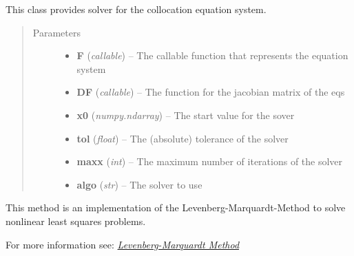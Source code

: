 \documentclass[letterpaper,10pt,english]{sphinxmanual}
\begin{document}
\begin{fulllineitems}
\label{pytrajectory:pytrajectory.solver.Solver}
This class provides solver for the collocation equation system.
\begin{quote}\begin{description}
\item[{Parameters}] \leavevmode\begin{itemize}
\item {} 
\textbf{F} (\emph{callable}) -- The callable function that represents the equation system

\item {} 
\textbf{DF} (\emph{callable}) -- The function for the jacobian matrix of the eqs

\item {} 
\textbf{x0} (\emph{numpy.ndarray}) -- The start value for the sover

\item {} 
\textbf{tol} (\emph{float}) -- The (absolute) tolerance of the solver

\item {} 
\textbf{maxx} (\emph{int}) -- The maximum number of iterations of the solver

\item {} 
\textbf{algo} (\emph{str}) -- The solver to use

\end{itemize}

\end{description}\end{quote}

\begin{fulllineitems}
\label{pytrajectory:pytrajectory.solver.Solver.gauss}
\end{fulllineitems}


\begin{fulllineitems}
\label{pytrajectory:pytrajectory.solver.Solver.leven}
This method is an implementation of the Levenberg-Marquardt-Method
to solve nonlinear least squares problems.

For more information see: {\hyperref[guide/background:levenberg-marquardt]{\emph{Levenberg-Marquardt Method}}}


\end{fulllineitems}
\end{fulllineitems}
\end{document}
